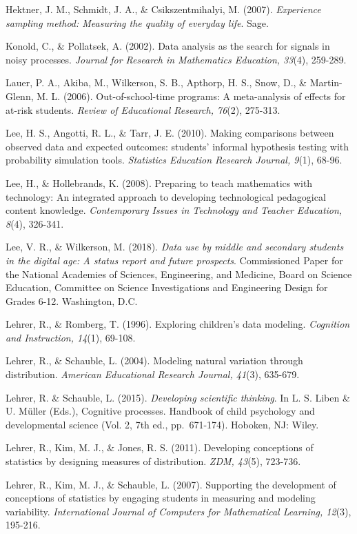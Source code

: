 \documentclass[]{msu-thesis}
\theoremstyle{definition}
\theoremstyle{definition}
\theoremstyle{definition}
\theoremstyle{remark}
\begin{document}
Hektner, J. M., Schmidt, J. A., \& Csikszentmihalyi, M. (2007).
\emph{Experience sampling method: Measuring the quality of everyday
life}. Sage.

Konold, C., \& Pollatsek, A. (2002). Data analysis as the search for
signals in noisy processes. \emph{Journal for Research in Mathematics
Education, 33}(4), 259-289.

Lauer, P. A., Akiba, M., Wilkerson, S. B., Apthorp, H. S., Snow, D., \&
Martin-Glenn, M. L. (2006). Out-of-school-time programs: A meta-analysis
of effects for at-risk students. \emph{Review of Educational Research,
76}(2), 275-313.

Lee, H. S., Angotti, R. L., \& Tarr, J. E. (2010). Making comparisons
between observed data and expected outcomes: students' informal
hypothesis testing with probability simulation tools. \emph{Statistics
Education Research Journal, 9}(1), 68-96.

Lee, H., \& Hollebrands, K. (2008). Preparing to teach mathematics with
technology: An integrated approach to developing technological
pedagogical content knowledge. \emph{Contemporary Issues in Technology
and Teacher Education, 8}(4), 326-341.

Lee, V. R., \& Wilkerson, M. (2018). \emph{Data use by middle and
secondary students in the digital age: A status report and future
prospects}. Commissioned Paper for the National Academies of Sciences,
Engineering, and Medicine, Board on Science Education, Committee on
Science Investigations and Engineering Design for Grades 6-12.
Washington, D.C.

Lehrer, R., \& Romberg, T. (1996). Exploring children's data modeling.
\emph{Cognition and Instruction, 14}(1), 69-108.

Lehrer, R., \& Schauble, L. (2004). Modeling natural variation through
distribution. \emph{American Educational Research Journal, 41}(3),
635-679.

Lehrer, R. \& Schauble, L. (2015). \emph{Developing scientific
thinking}. In L. S. Liben \& U. Müller (Eds.), Cognitive processes.
Handbook of child psychology and developmental science (Vol. 2, 7th ed.,
pp.~671-174). Hoboken, NJ: Wiley.

Lehrer, R., Kim, M. J., \& Jones, R. S. (2011). Developing conceptions
of statistics by designing measures of distribution. \emph{ZDM, 43}(5),
723-736.

Lehrer, R., Kim, M. J., \& Schauble, L. (2007). Supporting the
development of conceptions of statistics by engaging students in
measuring and modeling variability. \emph{International Journal of
Computers for Mathematical Learning, 12}(3), 195-216.
\end{document}
